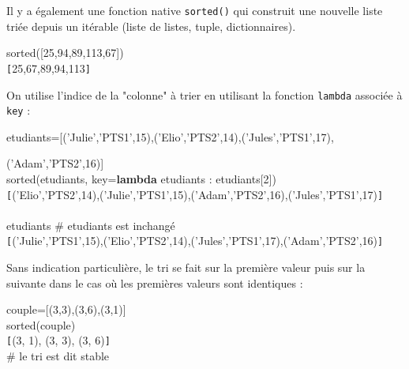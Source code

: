 \documentclass[t,11pt]{article}
\begin{document}
Il y a également une fonction native \texttt{sorted()} qui construit une nouvelle liste triée depuis un itérable (liste de listes, tuple, dictionnaires).

\begin{pythonshell}
\invite sorted([25,94,89,113,67])\\
\verb![!25,67,89,94,113\verb!]!
\end{pythonshell}

\vspace{-0.5cm}
On utilise l'indice de la "colonne" à trier en utilisant la fonction \texttt{lambda} associée à \texttt{key} :
\vspace{-0.5cm}
\begin{pythonshell}
\invite etudiants=[('Julie','PTS1',15),('Elio','PTS2',14),('Jules','PTS1',17),

('Adam','PTS2',16)]\\
\invite sorted(etudiants, key=\textbf{lambda} etudiants : etudiants[2])\\
\verb![!('Elio','PTS2',14),('Julie','PTS1',15),('Adam','PTS2',16),('Jules','PTS1',17)\verb!]!
\\
\\
\invite etudiants  \indente \# etudiants est inchangé\\
\verb![!('Julie','PTS1',15),('Elio','PTS2',14),('Jules','PTS1',17),('Adam','PTS2',16)\verb!]!
\end{pythonshell}

\vspace{-0.5cm}
Sans indication particulière, le tri se fait sur la première valeur puis sur la suivante dans le cas où les premières valeurs sont identiques :
\vspace{-0.5cm}

\begin{pythonshell}
\invite couple=[(3,3),(3,6),(3,1)]\\
\invite sorted(couple)\\
\verb![!(3, 1), (3, 3), (3, 6)\verb!]!\\
\# le tri est dit stable
\end{pythonshell}
\end{document}

